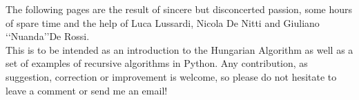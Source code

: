\documentclass[12pt]{ClasseMatematicamente}
\begin{document}
\pagestyle{fancy} 



 


 
 
 

\setcounter{page}{5}

\Issue




\noindent
The following pages are the result of sincere but disconcerted passion, some hours of spare time and the help of Luca Lussardi, Nicola De Nitti and Giuliano \lq\lq Nuanda\rq\rq \phantom{x}De Rossi. \\
This is to be intended as an introduction to the Hungarian Algorithm as well as a set of examples of recursive algorithms in Python. Any contribution, as suggestion, correction or improvement is welcome, so please do not hesitate to leave a comment or send me an email!

\end{document}
